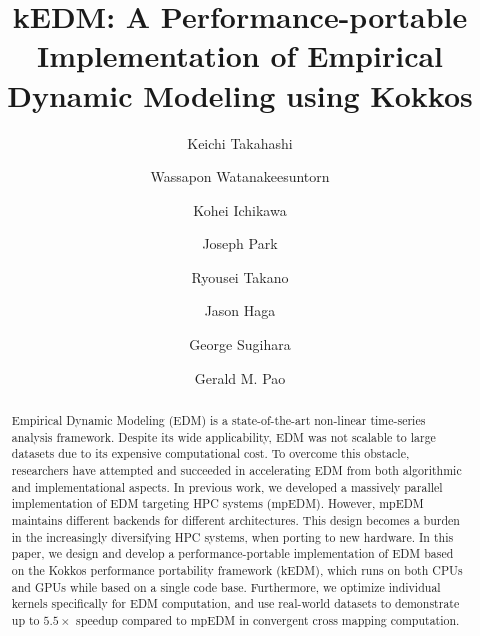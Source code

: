 \documentclass[sigconf]{acmart}
\begin{document}


\title{kEDM: A Performance-portable Implementation of Empirical Dynamic
Modeling using Kokkos}

\author{Keichi Takahashi}
\author{Wassapon Watanakeesuntorn}
\author{Kohei Ichikawa}

\author{Joseph Park}

\author{Ryousei Takano}
\author{Jason Haga}

\author{George Sugihara}

\author{Gerald M. Pao}

\renewcommand{\shortauthors}{K. Takahashi et al.}

\begin{abstract}
    Empirical Dynamic Modeling (EDM) is a state-of-the-art non-linear time-series analysis framework. Despite its wide applicability, EDM was not
    scalable to large datasets due to its expensive computational cost. To
    overcome this obstacle, researchers have attempted and succeeded in accelerating EDM from
    both algorithmic and implementational aspects. In previous work, we
     developed a massively parallel implementation of EDM targeting
    HPC systems (mpEDM). However, mpEDM maintains different backends for different
    architectures. This design becomes a burden in the
    increasingly diversifying HPC systems, when porting to new hardware. In this paper, we design
    and develop a performance-portable implementation of EDM based on
    the Kokkos performance portability framework (kEDM), which runs on both CPUs and
    GPUs while based on a single code base. Furthermore, we optimize individual kernels specifically for EDM computation, and use real-world datasets to demonstrate up to $5.5\times$ speedup compared to mpEDM
    in convergent cross mapping computation.
\end{abstract}
\end{document}

